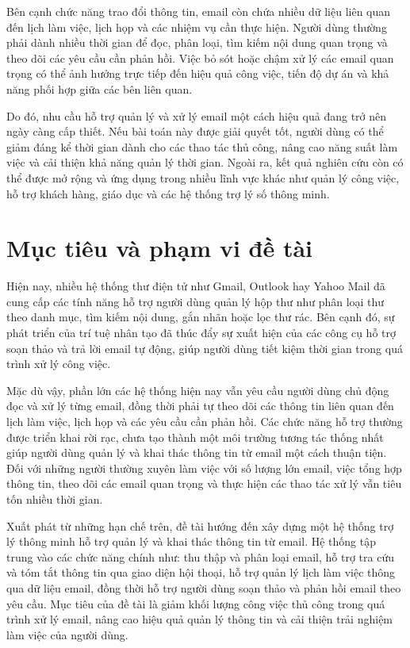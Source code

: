 \documentclass[../DoAn.tex]{subfiles}
\begin{document}
Bên cạnh chức năng trao đổi thông tin, email còn chứa nhiều dữ liệu liên quan đến lịch làm việc, lịch họp và các nhiệm vụ cần thực hiện. Người dùng thường phải dành nhiều thời gian để đọc, phân loại, tìm kiếm nội dung quan trọng và theo dõi các yêu cầu cần phản hồi. Việc bỏ sót hoặc chậm xử lý các email quan trọng có thể ảnh hưởng trực tiếp đến hiệu quả công việc, tiến độ dự án và khả năng phối hợp giữa các bên liên quan.

Do đó, nhu cầu hỗ trợ quản lý và xử lý email một cách hiệu quả đang trở nên ngày càng cấp thiết. Nếu bài toán này được giải quyết tốt, người dùng có thể giảm đáng kể thời gian dành cho các thao tác thủ công, nâng cao năng suất làm việc và cải thiện khả năng quản lý thời gian. Ngoài ra, kết quả nghiên cứu còn có thể được mở rộng và ứng dụng trong nhiều lĩnh vực khác như quản lý công việc, hỗ trợ khách hàng, giáo dục và các hệ thống trợ lý số thông minh.


\section{Mục tiêu và phạm vi đề tài}
\label{section:1.2}

Hiện nay, nhiều hệ thống thư điện tử như Gmail, Outlook hay Yahoo Mail đã cung cấp các tính năng hỗ trợ người dùng quản lý hộp thư như phân loại thư theo danh mục, tìm kiếm nội dung, gắn nhãn hoặc lọc thư rác. Bên cạnh đó, sự phát triển của trí tuệ nhân tạo đã thúc đẩy sự xuất hiện của các công cụ hỗ trợ soạn thảo và trả lời email tự động, giúp người dùng tiết kiệm thời gian trong quá trình xử lý công việc.

Mặc dù vậy, phần lớn các hệ thống hiện nay vẫn yêu cầu người dùng chủ động đọc và xử lý từng email, đồng thời phải tự theo dõi các thông tin liên quan đến lịch làm việc, lịch họp và các yêu cầu cần phản hồi. Các chức năng hỗ trợ thường được triển khai rời rạc, chưa tạo thành một môi trường tương tác thống nhất giúp người dùng quản lý và khai thác thông tin từ email một cách thuận tiện. Đối với những người thường xuyên làm việc với số lượng lớn email, việc tổng hợp thông tin, theo dõi các email quan trọng và thực hiện các thao tác xử lý vẫn tiêu tốn nhiều thời gian.

Xuất phát từ những hạn chế trên, đề tài hướng đến xây dựng một hệ thống trợ lý thông minh hỗ trợ quản lý và khai thác thông tin từ email. Hệ thống tập trung vào các chức năng chính như: thu thập và phân loại email, hỗ trợ tra cứu và tóm tắt thông tin qua giao diện hội thoại, hỗ trợ quản lý lịch làm việc thông qua dữ liệu email, đồng thời hỗ trợ người dùng soạn thảo và phản hồi email theo yêu cầu. Mục tiêu của đề tài là giảm khối lượng công việc thủ công trong quá trình xử lý email, nâng cao hiệu quả quản lý thông tin và cải thiện trải nghiệm làm việc của người dùng.
\end{document}
